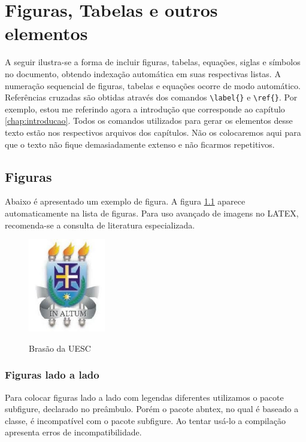 
\chapter{Figuras, Tabelas e outros elementos}\label{chap:fundamentacaoTeorica}
A seguir ilustra-se a forma de incluir figuras, tabelas, equações, siglas e símbolos no documento, obtendo indexação automática em suas respectivas listas.
A numeração sequencial de figuras, tabelas e equações ocorre de modo automático.
Referências cruzadas são obtidas através dos comandos \verb#\label{}# e \verb#\ref{}#.
Por exemplo, estou me referindo agora a introdução que corresponde ao  capítulo \ref{chap:introducao}. Todos os comandos utilizados para gerar os elementos desse texto estão nos respectivos arquivos dos capítulos. Não os colocaremos aqui para que o texto não fique demasiadamente extenso e não ficarmos repetitivos.

\section{Figuras}
\label{sec:figuras}

Abaixo é apresentado um exemplo de figura. A  figura \ref{fig:brasaouesc} aparece automaticamente na lista de figuras. Para uso avançado de imagens no LATEX, recomenda-se a consulta de literatura especializada.

\begin{figure}[!htb]
	\centering
	\caption{Brasão da UESC}
	\includegraphics[width=0.3\textwidth]{./04-figuras/brasaouesc}
	\label{fig:brasaouesc}
\end{figure}

\subsection{Figuras lado a lado}\label{figladoalado}
Para colocar figuras lado a lado com legendas diferentes utilizamos o pacote {\ttfamily subfigure}, declarado no preâmbulo. Porém o pacote abntex, no qual é baseado a classe, é incompatível com o pacote {\ttfamily subfigure}. Ao tentar usá-lo a compilação apresenta erros de incompatibilidade. 

